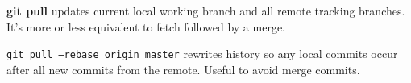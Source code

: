 %

\textbf{git pull} updates current local working branch  and all remote tracking branches.
It's more or less equivalent to fetch followed by a merge.

\texttt{git pull --rebase origin master} rewrites history so any local commits occur after all new commits from the remote.
Useful to avoid merge commits.

%
